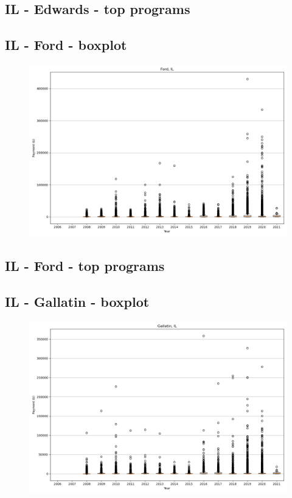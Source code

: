 \subsection*{IL - Edwards - top programs}

\newpage
\subsection*{IL - Ford - boxplot}
\begin{figure}[h]
\centering
\includegraphics[width=7in]{../output/boxplots/counties/Ford-IL_boxplot.png}
\end{figure}


\subsection*{IL - Ford - top programs}

\newpage
\subsection*{IL - Gallatin - boxplot}
\begin{figure}[h]
\centering
\includegraphics[width=7in]{../output/boxplots/counties/Gallatin-IL_boxplot.png}
\end{figure}


